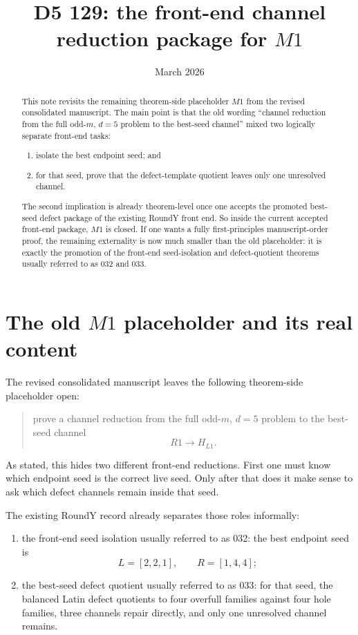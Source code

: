 \documentclass[11pt]{article}
\title{D5 129: the front-end channel reduction package for $M1$}
\author{}
\date{March 2026}
\newcommand{\HLone}{H_{L1}}
\begin{document}
\maketitle

\begin{abstract}
This note revisits the remaining theorem-side placeholder $M1$ from the
revised consolidated manuscript.
The main point is that the old wording ``channel reduction from the full
odd-$m$, $d=5$ problem to the best-seed channel'' mixed two logically
separate front-end tasks:
\begin{enumerate}[label=\textup{(\roman*)},leftmargin=2.5em]
\item isolate the best endpoint seed; and
\item for that seed, prove that the defect-template quotient leaves only one
      unresolved channel.
\end{enumerate}
The second implication is already theorem-level once one accepts the promoted
best-seed defect package of the existing RoundY front end.
So inside the current accepted front-end package, $M1$ is closed.
If one wants a fully first-principles manuscript-order proof, the remaining
externality is now much smaller than the old placeholder: it is exactly the
promotion of the front-end seed-isolation and defect-quotient theorems usually
referred to as \textup{032} and \textup{033}.
\end{abstract}

\section{The old $M1$ placeholder and its real content}

The revised consolidated manuscript leaves the following theorem-side
placeholder open:
\begin{quote}
prove a channel reduction from the full odd-$m$, $d=5$ problem to the
best-seed channel
\[
R1 \to \HLone.
\]
\end{quote}

As stated, this hides two different front-end reductions.
First one must know which endpoint seed is the correct live seed.
Only after that does it make sense to ask which defect channels remain inside
that seed.

The existing RoundY record already separates those roles informally:
\begin{enumerate}[label=\textup{(F\arabic*)},leftmargin=2.8em]
\item the front-end seed isolation usually referred to as \textup{032}:
      the best endpoint seed is
      \[
      L=[2,2,1], \qquad R=[1,4,4];
      \]
\item the best-seed defect quotient usually referred to as \textup{033}:
      for that seed, the balanced Latin defect quotients to four overfull
      families against four hole families, three channels repair directly, and
      only one unresolved channel remains.
\end{enumerate}
\end{document}
